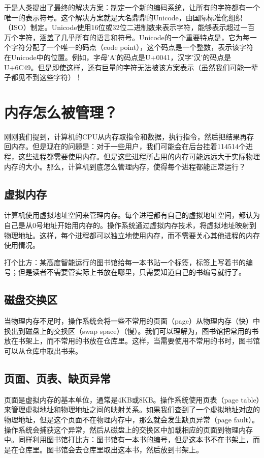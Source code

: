 \documentclass[../main.tex]{subfiles}
\begin{document}
于是人类提出了最终的解决方案：制定一个新的编码系统，让所有的字符都有一个唯一的表示符号。这个解决方案就是大名鼎鼎的Unicode，由国际标准化组织（ISO）制定。Unicode使用16位或32位二进制数来表示字符，能够表示超过一百万个字符，涵盖了几乎所有的语言和符号。Unicode的一个重要特点是，它为每一个字符分配了一个唯一的码点（code point），这个码点是一个整数，表示该字符在Unicode中的位置。例如，字母'A'的码点是U+0041，汉字'汉'的码点是U+6C49。但是即使这样，还有巨量的字符无法被该方案表示（虽然我们可能一辈子都见不到这些字符）！

\section{内存怎么被管理？}

刚刚我们提到，计算机的CPU从内存取指令和数据，执行指令，然后把结果再存回内存。但是现在的问题是：对于一些用户，我们可能会在后台挂着114514个进程，这些进程都需要使用内存。但是这些进程所占用的内存可能远远大于实际物理内存的大小。那么，计算机到底怎么管理内存，使得每个进程都能正常运行？

\subsection{虚拟内存}

计算机使用虚拟地址空间来管理内存。每个进程都有自己的虚拟地址空间，都认为自己是从0号地址开始用内存的。操作系统通过虚拟内存技术，将虚拟地址映射到物理地址。这样，每个进程都可以独立地使用内存，而不需要关心其他进程的内存使用情况。

打个比方：某高度智能运行的图书馆给每一本书贴一个标签，标签上写着书的编号；但是读者不需要管实际上书放在哪里，只需要知道自己的书编号就行了。

\subsection{磁盘交换区}

当物理内存不足时，操作系统会将一些不常用的页面（page）从物理内存（快）中换出到磁盘上的交换区（swap space）（慢）。我们可以理解为，图书馆把常用的书放在书架上，而不常用的书放在仓库里。这样，当需要使用不常用的书时，图书馆可以从仓库中取出书来。

\subsection{页面、页表、缺页异常}

页面是虚拟内存的基本单位，通常是4KB或8KB。操作系统使用页表（page table）来管理虚拟地址和物理地址之间的映射关系。如果我们查到了一个虚拟地址对应的物理地址，但是这个页面不在物理内存中，那么就会发生缺页异常（page fault）。操作系统会捕获这个异常，然后从磁盘上的交换区中加载相应的页面到物理内存中。同样利用图书馆打比方：图书馆有一本书的编号，但是这本书不在书架上，而是在仓库里。图书馆会去仓库里取出这本书，然后放到书架上。
\end{document}
